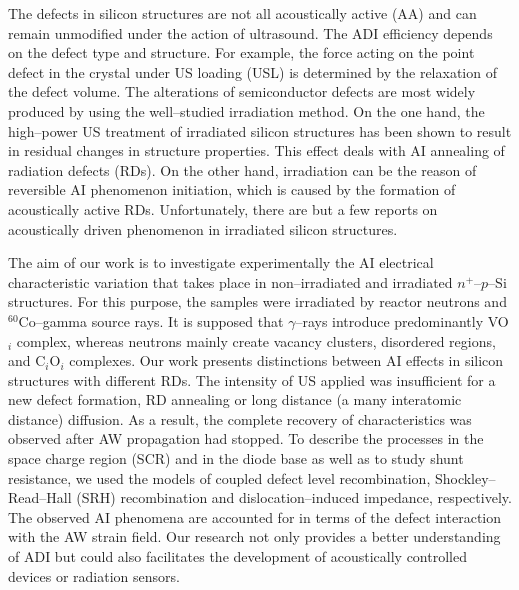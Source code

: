 \documentclass[aip,jap, amsmath,amssymb,reprint]{revtex4-1}
\begin{document}
The defects in silicon structures are not all acoustically active (AA) and can remain unmodified under the action of ultrasound.
The ADI efficiency depends on the defect type and structure. \cite{UST:Medvid}
For example, the force acting on the point defect in the crystal under US loading (USL) is determined by the relaxation of the defect volume\cite{MirzadeJAP2011,PeleshchakUJF2016}.
The alterations of semiconductor defects are most widely produced by using the well--studied irradiation method.
On the one hand, the high--power US treatment of irradiated silicon structures has been shown\cite{YOlikh2007TPL,Parchinskii2006,Gorb2010,Podolian2012} to result in residual changes in structure properties.
This effect deals with AI annealing of radiation defects (RDs).
On the other hand, irradiation can be the reason of reversible AI phenomenon initiation, \cite{YOlikh2006TPL,YOlikhTPL2011} which is caused by the formation of acoustically active RDs.
Unfortunately, there are but a few reports on acoustically driven phenomenon in irradiated silicon structures.

The aim of our work is to investigate experimentally the AI electrical characteristic variation that takes place in non--irradiated and irradiated $n^+$--$p$--Si structures.
For this purpose, the samples were irradiated by reactor neutrons and $^{60}$Co--gamma source rays.
It is supposed that $\gamma$--rays introduce predominantly
VO$_i$ complex,\cite{NIEL:Jafari,Gamma:Prabhakara,NIEL:Moll}
whereas neutrons mainly create vacancy clusters, \cite{Rew:Srour,Junkes} disordered regions, \cite{Neutron:Arutyunov} and C$_i$O$_i$ complexes.  \cite{NIEL:Moll,neutron:Londos}
Our work presents distinctions between AI effects in silicon structures with different RDs.
The intensity of US applied was insufficient for a new defect formation, RD annealing or long distance (a many interatomic distance) diffusion.
As a result, the complete recovery of characteristics was observed after AW propagation had stopped.
To describe the processes in the space charge region (SCR) and in the diode base as well as to study shunt resistance, we used the models of coupled defect level recombination,\cite{CDLR:JAP1995,CDLR:JAP} Shockley--Read--Hall (SRH) recombination and dislocation--induced impedance,\cite{Rsh:Gopal2003,Rsh:Gopal2004} respectively.
The observed AI phenomena are accounted for in terms of the defect interaction with the AW strain field.\cite{MirzadeJAP2011,PeleshchakUJF2016}
Our research not only provides a better understanding of ADI but could also facilitates the development of acoustically controlled devices or radiation sensors.
\end{document}
